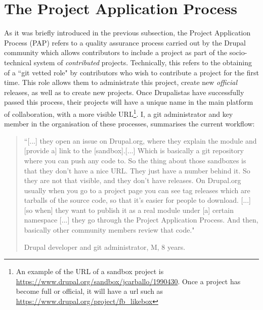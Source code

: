 \section{The Project Application Process}
\label{subsec:emergence-pap}

As it was briefly introduced in the previous subsection, the Project Application Process (PAP) refers to a quality assurance process carried out by the Drupal community which allows contributors to include a project as part of the socio-technical system of \textit{contributed} projects. Technically, this refers to the obtaining of a ``git vetted role"  by contributors who wish to contribute a project for the first time. This role allows them to administrate this project, create new \textit{official} releases, as well as to create new projects. Once Drupalistas have successfully passed this process, their projects will have a unique name in the main platform of collaboration, with a more visible URL\footnote{An example of the URL of a sandbox project is \url{https://www.drupal.org/sandbox/jcarballo/1990430}. Once a project has become full or official, it will have a url such as \url{https://www.drupal.org/project/fb_likebox}}. I, a git administrator and key member in the organisation of these processes, summarises the current workflow:

\begin{quotation}
``[...] they open an issue on Drupal.org, where they explain the module and [provide a] link to the [sandbox].[...] Which is basically a git repository where you can push any code to. So the thing about those sandboxes is that they don't have a nice URL. They just have a number behind it. So they are not that visible, and they don't have releases. On Drupal.org usually when you go to a project page you can see tag releases which are tarballs of the source code, so that it's easier for people to download. [...] [so when] they want to publish it as a real module under [a] certain namespace [...] they go through the Project Application Process. And then, basically other community members review that code."
\begin{flushright}\footnotesize{Drupal developer and git administrator, M, 8 years.}\end{flushright}
\end{quotation}

